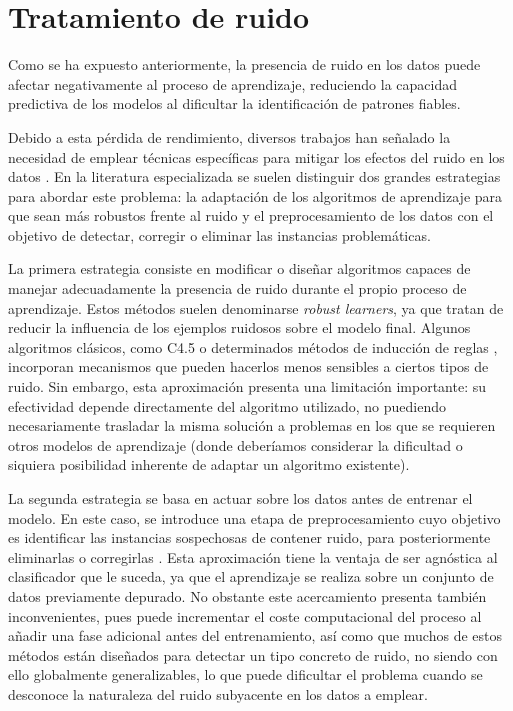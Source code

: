 \documentclass[print, color]{ugrTFG}
\begin{document}
 \section{Tratamiento de ruido}

 Como se ha expuesto anteriormente, la presencia de ruido en los datos puede afectar negativamente al proceso de aprendizaje, reduciendo la capacidad predictiva de los modelos al dificultar la identificación de patrones fiables.

 Debido a esta pérdida de rendimiento, diversos trabajos han señalado la necesidad de emplear técnicas específicas para mitigar los efectos del ruido en los datos \cite{zhu2004class}. En la literatura especializada se suelen distinguir dos grandes estrategias para abordar este problema: la adaptación de los algoritmos de aprendizaje para que sean más robustos frente al ruido y el preprocesamiento de los datos con el objetivo de detectar, corregir o eliminar las instancias problemáticas.

 La primera estrategia consiste en modificar o diseñar algoritmos capaces de manejar adecuadamente la presencia de ruido durante el propio proceso de aprendizaje. Estos métodos suelen denominarse \textit{robust learners}, ya que tratan de reducir la influencia de los ejemplos ruidosos sobre el modelo final. Algunos algoritmos clásicos, como C4.5 \cite{quinlan1993c45} o determinados métodos de inducción de reglas \cite{cohen1995fast}, incorporan mecanismos que pueden hacerlos menos sensibles a ciertos tipos de ruido. Sin embargo, esta aproximación presenta una limitación importante: su efectividad depende directamente del algoritmo utilizado, no puediendo necesariamente trasladar la misma solución a problemas en los que se requieren otros modelos de aprendizaje (donde deberíamos considerar la dificultad o siquiera posibilidad inherente de adaptar un algoritmo existente).

 La segunda estrategia se basa en actuar sobre los datos antes de entrenar el modelo. En este caso, se introduce una etapa de preprocesamiento cuyo objetivo es identificar las instancias sospechosas de contener ruido, para posteriormente eliminarlas o corregirlas \cite{brodley1999identifying,gamberger1999experiments}. Esta aproximación tiene la ventaja de ser agnóstica al clasificador que le suceda, ya que el aprendizaje se realiza sobre un conjunto de datos previamente depurado. No obstante este acercamiento presenta también inconvenientes, pues puede incrementar el coste computacional del proceso al añadir una fase adicional antes del entrenamiento, así como que muchos de estos métodos están diseñados para detectar un tipo concreto de ruido, no siendo con ello globalmente generalizables, lo que puede dificultar el problema cuando se desconoce la naturaleza del ruido subyacente en los datos a emplear.
\end{document}
